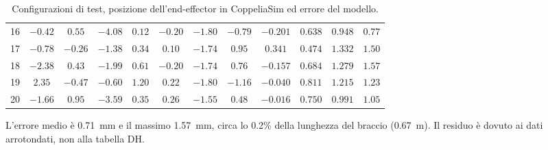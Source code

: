 \begin{table}[H]
\begin{tabular}{|c|ccccccc|ccc|c|}
16 & $-0.42$ & $0.55$ & $-4.08$ & $0.12$ & $-0.20$ & $-1.80$ & $-0.79$ & $-0.201$ & $0.638$ & $0.948$ & $0.77$ \\
17 & $-0.78$ & $-0.26$ & $-1.38$ & $0.34$ & $0.10$ & $-1.74$ & $0.95$ & $0.341$ & $0.474$ & $1.332$ & $1.50$ \\
18 & $-2.38$ & $0.43$ & $-1.99$ & $0.61$ & $-0.20$ & $-1.74$ & $0.76$ & $-0.157$ & $0.684$ & $1.279$ & $1.57$ \\
19 & $2.35$ & $-0.47$ & $-0.60$ & $1.20$ & $0.22$ & $-1.80$ & $-1.16$ & $-0.040$ & $0.811$ & $1.215$ & $1.23$ \\
20 & $-1.66$ & $0.95$ & $-3.59$ & $0.35$ & $0.26$ & $-1.55$ & $0.48$ & $-0.016$ & $0.750$ & $0.991$ & $1.05$ \\
\hline
\end{tabular}
\caption{Configurazioni di test, posizione dell'end-effector in CoppeliaSim ed errore del modello.}
\label{tab:hw1-validazione}
\end{table}

\noindent
L'errore medio \`e 0.71~mm e il massimo 1.57~mm, circa lo 0.2\% della lunghezza del braccio (0.67~m).
Il residuo \`e dovuto ai dati arrotondati, non alla tabella DH.
